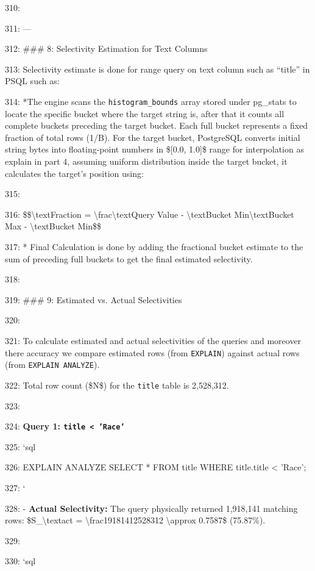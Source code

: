 \documentclass[11pt,a4paper]{article}
\begin{document}
310:

311: ---

312: \#\#\# 8: Selectivity Estimation for Text Columns

313: Selectivity estimate is done for range query on text column such as “title” in PSQL such as:

314: *The engine scans the \texttt{histogram\_bounds} array stored under pg\_stats to locate the specific bucket where the target string  is, after that it counts all complete buckets preceding the target bucket. Each full bucket represents a fixed fraction of total rows (1/B). For the target bucket, PostgreSQL converts initial string bytes into floating-point numbers in \$[0.0, 1.0]\$ range for interpolation as explain in part 4,  assuming uniform distribution inside the target bucket, it calculates the target's position using:

315:

316: \$\$\textbackslash{}text{Fraction} = \textbackslash{}frac{\textbackslash{}text{Query Value} - \textbackslash{}text{Bucket Min}}{\textbackslash{}text{Bucket Max} - \textbackslash{}text{Bucket Min}}\$\$

317: *   Final Calculation is done by adding the fractional bucket estimate to the sum of preceding full buckets to get the final estimated selectivity.

318:

319: \#\#\# 9: Estimated vs. Actual Selectivities

320:

321: To calculate estimated and actual selectivities of the queries and moreover there accuracy we compare estimated rows (from \texttt{EXPLAIN}) against actual rows (from \texttt{EXPLAIN ANALYZE}).

322: Total row count (\$N\$) for the \texttt{title} table is 2,528,312.

323:

324: \textbf{Query 1: \texttt{title < 'Race'}}

325: \texttt{}`sql

326: EXPLAIN ANALYZE SELECT * FROM title WHERE title.title < 'Race';

327: \texttt{}`

328: - \textbf{Actual Selectivity:} The query physically returned 1,918,141 matching rows: \$S\_{\textbackslash{}text{act}} = \textbackslash{}frac{1918141}{2528312} \textbackslash{}approx 0.7587\$ (75.87\%).

329:

330: \texttt{}`sql
\end{document}

